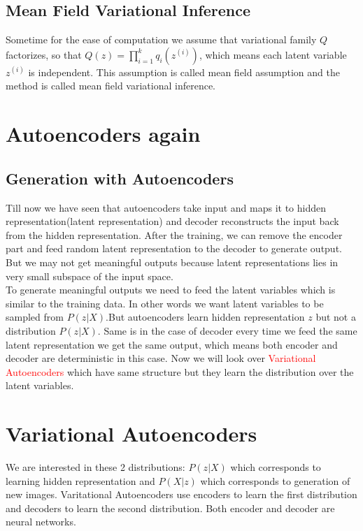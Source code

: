 \documentclass[10pt,a4paper]{article}
\begin{document}
\subsection{Mean Field Variational Inference}
Sometime for the ease of computation we assume that variational family $Q$ factorizes, so that $Q(z) = \prod_{i=1}^{k} q_i(z^{(i)})$, which means each latent variable $z^{(i)}$ is independent. This assumption is called mean field assumption and the method is called mean field variational inference. 

\section{Autoencoders again}
\subsection{Generation with Autoencoders}
Till now we have seen that autoencoders take input and maps it to hidden representation(latent representation) and decoder reconstructs the input back from the hidden representation. After the training, we can remove the encoder part and feed random latent representation to the decoder to generate output. But we may not get meaningful outputs because latent representations lies in very small subspace of the input space.\\
To generate meaningful outputs we need to feed the latent variables which is similar to the training data. In other words we want latent variables to be sampled from $P(z|X)$.But autoencoders learn hidden representation $z$ but not a distribution $P(z|X)$. Same is in the case of decoder every time we feed the same latent representation we get the same output, which means both encoder and decoder are deterministic in this case. Now we will look over \textcolor{red}{Variational Autoencoders} which have same structure but they learn the distribution over the latent variables.

\section{Variational Autoencoders}
We are interested in these 2 distributions: $P(z|X)$ which corresponds to learning hidden representation and $P(X|z)$ which corresponds to generation of new images. Varitational Autoencoders use encoders to learn the first distribution and decoders to learn the second distribution. Both encoder and decoder are neural networks.
\end{document}
